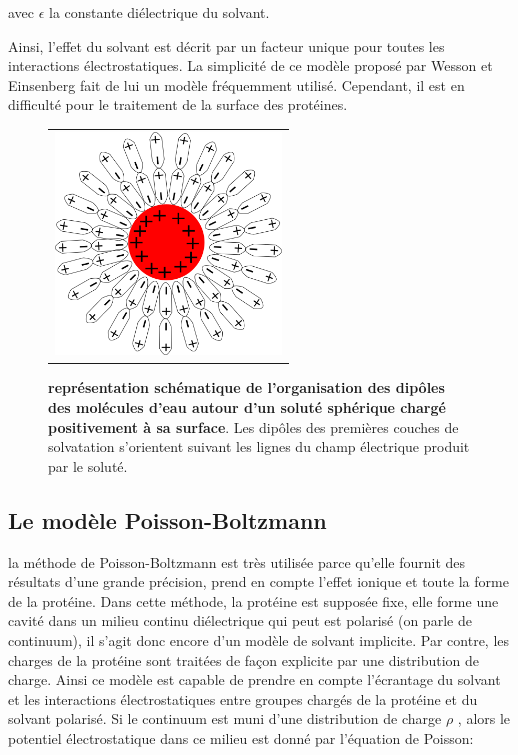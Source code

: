 avec $ \epsilon $ la constante diélectrique du solvant.

Ainsi, l'effet du solvant est décrit par un facteur unique pour toutes les interactions électrostatiques. La simplicité de ce modèle proposé par Wesson et Einsenberg \cite{Wesson92} fait de lui un modèle fréquemment utilisé. Cependant, il est en difficulté pour le traitement de la surface des protéines.


   \begin{figure}[!htbp]
     \centering
     \begin{tabular}{c}
       \includegraphics[width=6cm]{figure/ecrantage.png} &
     \end{tabular}
     
     \caption{\textbf{représentation schématique de l'organisation des dipôles des molécules d'eau autour d'un soluté sphérique chargé positivement à sa surface}. Les dipôles des premières couches de solvatation s'orientent suivant les lignes du champ électrique produit par le soluté.}
\label{graph:ecrantage}
   \end{figure}
   


\subsection{Le modèle Poisson-Boltzmann}
la méthode de Poisson-Boltzmann est très utilisée parce qu'elle fournit des résultats d'une grande précision, prend en compte l'effet ionique et toute la forme de la protéine. Dans cette méthode, la protéine est supposée fixe, elle forme une cavité dans un milieu continu diélectrique qui peut est polarisé (on parle de continuum), il s'agit donc encore d'un modèle de solvant implicite. Par contre, les charges de la protéine sont traitées de façon explicite par une distribution de charge. Ainsi ce modèle est capable de prendre en compte l'écrantage du solvant et les interactions électrostatiques entre groupes chargés de la protéine et du solvant polarisé. Si le continuum est muni d'une distribution de charge $\rho$ , alors le potentiel électrostatique dans ce milieu est donné par l'équation de Poisson:

